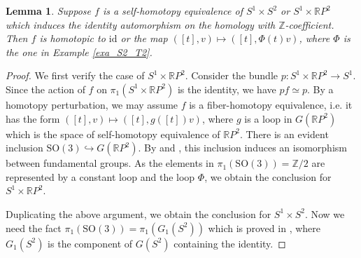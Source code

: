 \documentclass[12pt]{amsart}
\theoremstyle{plain}
\newtheorem{lemma}[theorem]{Lemma}
\theoremstyle{definition}
\theoremstyle{question}
\theoremstyle{remark}
\theoremstyle{assumption}
\numberwithin{equation}{section}
\theoremstyle{bigthm}
\begin{document}
\begin{lemma}\label{lem_self-homotopy}
Suppose $f$ is a self-homotopy equivalence of $S^{1} \times S^{2}$ or $S^{1} \times \mathbb{R} P^{2}$ which induces the identity automorphism on the homology with $\mathbb{Z}$-coefficient. Then $f$ is homotopic to $\mathrm{id}$ or the map $([t], v) \mapsto ([t], \Phi (t) v)$, where $\Phi$ is the one in Example \ref{exa_S2_T2}.
\end{lemma}
\begin{proof}
We first verify the case of $S^{1} \times \mathbb{R} P^{2}$. Consider the bundle $p \colon  S^{1} \times \mathbb{R} P^{2} \rightarrow S^{1}$. Since the action of $f$ on $\pi_{1} (S^{1} \times \mathbb{R} P^{2})$ is the identity, we have $p f \simeq p$. By a homotopy perturbation, we may assume $f$ is a fiber-homotopy equivalence, i.e. it has the form $([t], v) \mapsto ([t],  g([t]) v)$, where $g$ is a loop in $G(\mathbb{R} P^{2})$ which is the space of self-homotopy equivalence of $\mathbb{R} P^{2}$. There is an evident inclusion $\mathrm{SO} (3) \hookrightarrow G(\mathbb{R} P^{2})$. By \cite[Theorem~4.3]{Yamanoshita} and \cite[Remark~3.2]{Goncalves_Spreafico}, this inclusion induces an isomorphism between fundamental groups. As the elements in $\pi_{1} (\mathrm{SO} (3)) = \mathbb{Z}/2$ are represented by a constant loop and the loop $\Phi$, we obtain the conclusion for $S^{1} \times \mathbb{R} P^{2}$.

Duplicating the above argument, we obtain the conclusion for $S^{1} \times S^{2}$. Now we need the fact $\pi_{1} (\mathrm{SO} (3)) = \pi_{1} (G_{1} (S^{2}))$ which is proved in \cite{Hansen}, where $G_{1} (S^{2})$ is the component of $G (S^{2})$ containing the identity.
\end{proof}
\end{document}
